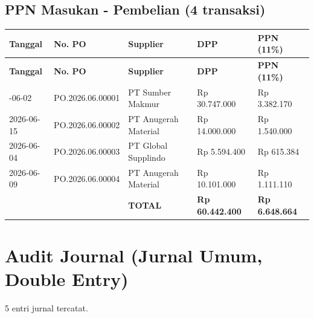 \documentclass[11pt,a4paper]{article}
\begin{document}
\subsection{PPN Masukan - Pembelian (4 transaksi)}
{\setlength{\tabcolsep}{5pt}\small
\begin{longtable}{l l p{4cm} R{2.6cm} R{2.4cm}}
\toprule
\textbf{Tanggal} & \textbf{No. PO} & \textbf{Supplier} & \textbf{DPP} & \textbf{PPN (11\%)} \\
\midrule\endfirsthead
\toprule
\textbf{Tanggal} & \textbf{No. PO} & \textbf{Supplier} & \textbf{DPP} & \textbf{PPN (11\%)} \\
\midrule\endhead
\bottomrule{}-06-02 & PO.2026.06.00001 & PT Sumber Makmur & Rp 30.747.000 & Rp 3.382.170 \\
2026-06-15 & PO.2026.06.00002 & PT Anugerah Material & Rp 14.000.000 & Rp 1.540.000 \\
2026-06-04 & PO.2026.06.00003 & PT Global Supplindo & Rp 5.594.400 & Rp 615.384 \\
2026-06-09 & PO.2026.06.00004 & PT Anugerah Material & Rp 10.101.000 & Rp 1.111.110 \\
 &  & \textbf{TOTAL} & \textbf{Rp 60.442.400} & \textbf{Rp 6.648.664} \\
\end{longtable}}

\section{Audit Journal (Jurnal Umum, Double Entry)}
5 entri jurnal tercatat.
\end{document}
